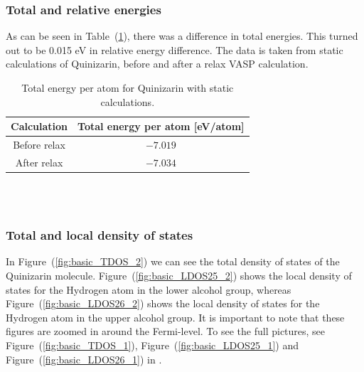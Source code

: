 \documentclass{article}
\begin{document}
      \vspace{1cm}

    \subsubsection{Total and relative energies}

      As can be seen in Table~(\ref{tab:TOTENquinizarin}), there was a difference in total energies. This turned out to be 0.015 eV in relative energy difference. The data is taken from static calculations of Quinizarin, before and after a relax VASP calculation. \\

      \begin{table}[H]
        \centering
        \caption{Total energy per atom for Quinizarin with static calculations. }
        \label{tab:TOTENquinizarin}
        \begin{tabular}{|c|c|}
            \hline
            Calculation & Total energy per atom [eV/atom]  \\
            \hline \hline
            Before relax & $-7.019$ \\
            After relax & $-7.034$ \\
            \hline
        \end{tabular} \\
        \hspace{0pt}\\
    \end{table}

      \vspace{1cm}

    \subsubsection{Total and local density of states}

      In Figure~(\ref{fig:basic_TDOS_2}) we can see the total density of states of the Quinizarin molecule. Figure~(\ref{fig:basic_LDOS25_2}) shows the local density of states for the Hydrogen atom in the lower alcohol group, whereas Figure~(\ref{fig:basic_LDOS26_2}) shows the local density of states for the Hydrogen atom in the upper alcohol group. It is important to note that these figures are zoomed in around the Fermi-level. To see the full pictures, see Figure~(\ref{fig:basic_TDOS_1}), Figure~(\ref{fig:basic_LDOS25_1}) and Figure~(\ref{fig:basic_LDOS26_1}) in . \\
\end{document}
